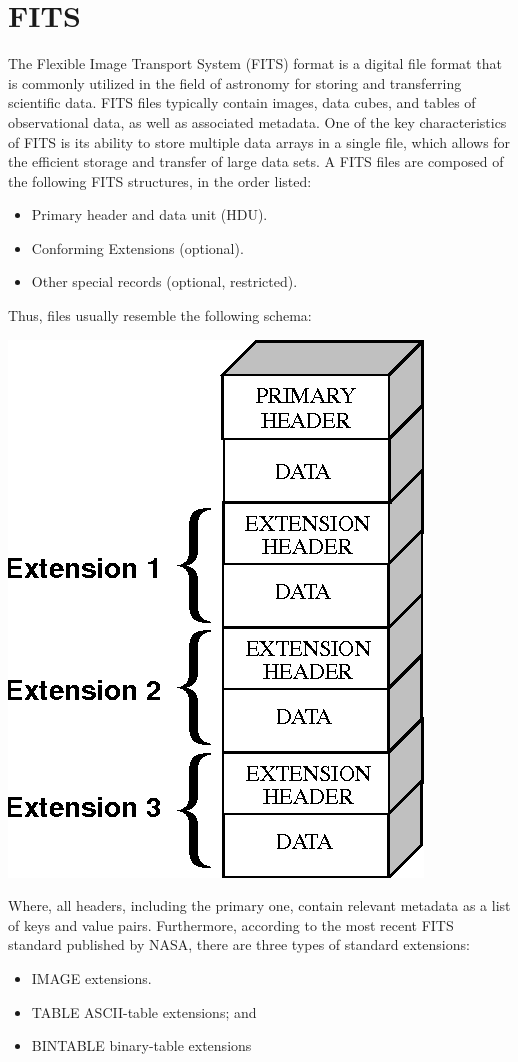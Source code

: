 \documentclass[licencjacka,en]{pracamgr}
\begin{document}
\section{FITS}
The Flexible Image Transport System (FITS) format is a digital file format that is commonly
utilized in the field of astronomy for storing and transferring scientific data. FITS files
typically contain images, data cubes, and tables of observational data, as well as associated metadata.
One of the key characteristics of FITS is its ability to store multiple data arrays in a single file, which
allows for the efficient storage and transfer of large data sets.
A FITS files are composed of the following FITS structures, in the order listed:
\begin{itemize}
	\item Primary header and data unit (HDU).
	\item Conforming Extensions (optional).
	\item Other special records (optional, restricted).
\end{itemize}
Thus, files usually resemble the following schema:

\centerline{\includegraphics[scale=0.3]{fits}}



Where, all headers, including the primary one, contain relevant metadata as a list of keys and value pairs.
Furthermore, according to the most recent FITS standard published by NASA, there are three types of standard extensions:
\begin{itemize}
	\item IMAGE extensions.
	\item TABLE ASCII-table extensions; and
	\item BINTABLE binary-table extensions
\end{itemize}
\end{document}
